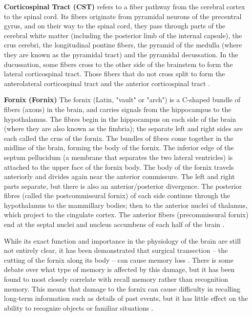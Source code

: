 \documentclass[../structure.tex]{subfiles}
\begin{document}
	\textbf{Corticospinal Tract (CST)}
		refers to a fiber pathway from the cerebral cortex to the spinal cord. Its fibers originate from pyramidal neurons of the precentral gyrus, and on their way to the spinal cord, they pass through parts of the cerebral white matter (including the posterior limb of the internal capsule), the crus cerebri, the longitudinal pontine fibers, the pyramid of the medulla (where they are known as the pyramidal tract) and the pyramidal decussation. In the ducussation, some fibers cross to the other side of the brainstem to form the lateral corticospinal tract. Those fibers that do not cross split to form the anterolateral corticospinal tract and the anterior corticospinal tract \cite{Washington1994}.
		
		\textbf{Fornix (Fornix)}
		The fornix (Latin, "vault" or "arch") is a C-shaped bundle of fibers (axons) in the brain, and carries signals from the hippocampus to the hypothalamus.
The fibres begin in the hippocampus on each side of the brain (where they are also known as the fimbria); the separate left and right sides are each called the crus of the fornix. The bundles of fibres come together in the midline of the brain, forming the body of the fornix. The inferior edge of the septum pellucidum (a membrane that separates the two lateral ventricles) is attached to the upper face of the fornix body.
The body of the fornix travels anteriorly and divides again near the anterior commissure. The left and right parts separate, but there is also an anterior/posterior divergence.
The posterior fibres (called the postcommissural fornix) of each side continue through the hypothalamus to the mammillary bodies; then to the anterior nuclei of thalamus, which project to the cingulate cortex.
The anterior fibers (precommissural fornix) end at the septal nuclei and nucleus accumbens of each half of the brain \cite{PDD2015}.

		While its exact function and importance in the physiology of the brain are still not entirely clear, it has been demonstrated that surgical transection – the cutting of the fornix along its body – can cause memory loss \cite{HenryGray1918}. There is some debate over what type of memory is affected by this damage, but it has been found to most closely correlate with recall memory rather than recognition memory. This means that damage to the fornix can cause difficulty in recalling long-term information such as details of past events, but it has little effect on the ability to recognize objects or familiar situations \cite{HenryGray1918}.
		
\end{document}
